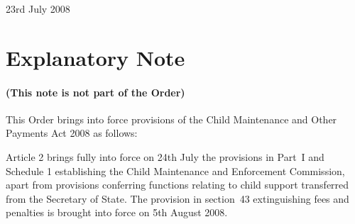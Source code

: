 \documentclass[12pt,a4paper]{article}
\begin{document}
23rd July 2008

\small

\part{Explanatory Note}

\renewcommand\parthead{— Explanatory Note}

\subsection*{(This note is not part of the Order)}

This Order brings into force provisions of the Child Maintenance and Other Payments Act 2008 as follows:

Article 2 brings fully into force on 24th July the provisions in Part~I and Schedule 1 establishing the Child Maintenance and Enforcement Commission, apart from provisions conferring functions relating to child support transferred from the Secretary of State. The provision in section~43 extinguishing fees and penalties is brought into force on 5th August 2008. 
\end{document}
